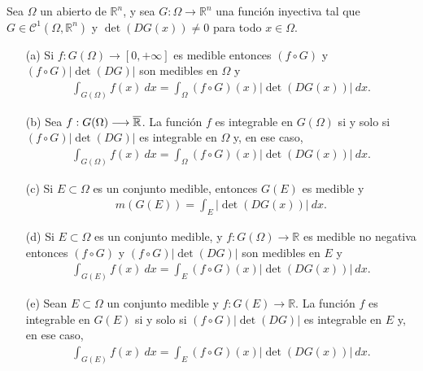 \begin{teo}
    Sea $\Omega$ un abierto de $\mathbb{R}^n$, y sea $G: \Omega \longrightarrow \mathbb{R}^n$ una función inyectiva tal que $G \in \mathcal{C}^1(\Omega, \mathbb{R}^n)$ y $\det(DG(x)) \not = 0$ para todo $x \in \Omega$.
    \begin{enumerate}
        \item[(a)] Si $f: G(\Omega) \longrightarrow [0,+\infty]$ es medible entonces $(f \circ G)$ y $(f \circ G)|\det(DG)|$ son medibles en $\Omega$ y
              \begin{align*}
                  \int_{G(\Omega)}{f(x) \ dx} = \int_{\Omega}{(f \circ G)(x)|\det(DG(x))| \ dx}.
              \end{align*}
        \item[(b)] Sea $f: G(\Omega) \longrightarrow \overline{\mathbb{R}}$. La función $f$ es integrable en $G(\Omega)$ si y solo si $(f \circ G)|\det(DG)|$ es integrable en $\Omega$ y, en ese caso,
              \begin{align*}
                  \int_{G(\Omega)}{f(x) \ dx} = \int_{\Omega}{(f \circ G)(x)|\det(DG(x))| \ dx}.
              \end{align*}
        \item[(c)] Si $E \subset \Omega$ es un conjunto medible, entonces $G(E)$ es medible y
              \begin{align*}
                  m(G(E)) = \int_{E}{|\det(DG(x))| \ dx}.
              \end{align*}
        \item[(d)] Si $E \subset \Omega$ es un conjunto medible, y $f: G(\Omega) \longrightarrow \mathbb{R}$ es medible no negativa entonces $(f \circ G)$ y $(f \circ G)|\det(DG)|$ son medibles en $E$ y
              \begin{align*}
                  \int_{G(E)}{f(x) \ dx} = \int_{E}{(f \circ G)(x)|\det(DG(x))| \ dx}.
              \end{align*}
        \item[(e)] Sean $E \subset \Omega$ un conjunto medible y $f: G(E) \longrightarrow \mathbb{R}$. La función $f$ es integrable en $G(E)$ si y solo si $(f \circ G)|\det(DG)|$ es integrable en $E$ y, en ese caso,
              \begin{align*}
                  \int_{G(E)}{f(x) \ dx} = \int_{E}{(f \circ G)(x)|\det(DG(x))| \ dx}.
              \end{align*}
    \end{enumerate}
\end{teo}

